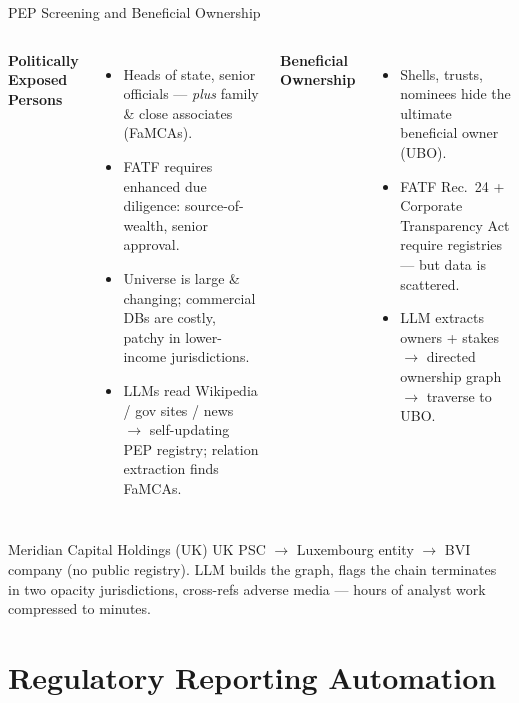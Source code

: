 \documentclass[9pt,t]{beamer}
\begin{document}
\begin{frame}{PEP Screening and Beneficial Ownership}
\begin{columns}[T]
\textbf{Politically Exposed Persons}
\begin{itemize}\footnotesize
  \item Heads of state, senior officials --- \emph{plus} family \& close
        associates (FaMCAs).
  \item FATF requires enhanced due diligence: source-of-wealth, senior approval.
  \item Universe is large \& changing; commercial DBs are costly, patchy in
        lower-income jurisdictions.
  \item LLMs read Wikipedia / gov sites / news $\to$ self-updating PEP registry;
        relation extraction finds FaMCAs.
\end{itemize}

\textbf{Beneficial Ownership}
\begin{itemize}\footnotesize
  \item Shells, trusts, nominees hide the ultimate beneficial owner (UBO).
  \item FATF Rec.\ 24 + Corporate Transparency Act require registries --- but
        data is scattered.
  \item LLM extracts owners + stakes $\to$ directed ownership graph $\to$ traverse
        to UBO.
\end{itemize}
\end{columns}

\medskip
\begin{exampleblock}{Meridian Capital Holdings (UK)}
UK PSC $\to$ Luxembourg entity $\to$ BVI company (no public registry). LLM builds
the graph, flags the chain terminates in two opacity jurisdictions, cross-refs
adverse media --- hours of analyst work compressed to minutes.
\end{exampleblock}
\end{frame}

\section{Regulatory Reporting Automation}
\end{document}
